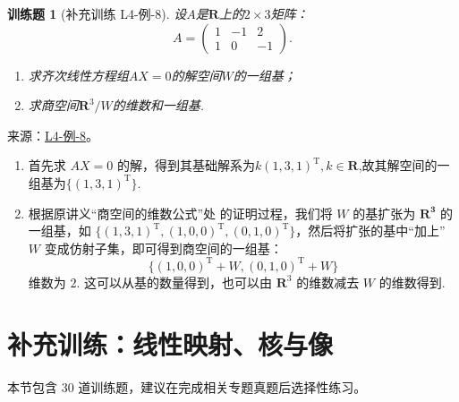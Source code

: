 \documentclass[12pt,fontset=fandol]{ctexart}
\newtheorem{exercise}{训练题}[section]
\begin{document}
\begin{exercise}[补充训练 L4-例-8]\label{prob:L4-例-8}
设$A$是$\mathbf{R}$上的$2\times 3$矩阵：
    \[A=\begin{pmatrix}
            1 & -1 & 2 \\ 1 & 0 & -1
        \end{pmatrix}.\]
    \begin{enumerate}
        \item 求齐次线性方程组$AX=0$的解空间$W$的一组基；

        \item 求商空间$\mathbf{R}^3/W$的维数和一组基.
    \end{enumerate}
\end{exercise}
\noindent 来源：\href{https://github.com/yhwu-is/Linear-Algebra-Left-Undone/blob/new/%E8%AE%B2%E4%B9%89/%E4%B8%93%E9%A2%98/4%20%E7%BA%BF%E6%80%A7%E7%A9%BA%E9%97%B4%E7%9A%84%E8%BF%90%E7%AE%97.tex}{L4-例-8}。
\begin{solve}
\begin{enumerate}
        \item 首先求 $AX=0$ 的解，得到其基础解系为$k(1,3,1)^{\mathrm{T}},k \in \mathbf{R}$,故其解空间的一组基为$\{(1,3,1)^{\mathrm{T}}\}$.
        \item 根据原讲义“商空间的维数公式”处 的证明过程，我们将 $W$ 的基扩张为 $\mathbf{R^3}$ 的一组基，如 $\{(1,3,1)^{\mathrm{T}},(1,0,0)^{\mathrm{T}},(0,1,0)^{\mathrm{T}}\}$，然后将扩张的基中``加上'' $W$ 变成仿射子集，即可得到商空间的一组基：
        \[
            \{(1,0,0)^{\mathrm{T}}+W,(0,1,0)^{\mathrm{T}}+W\}
        \]
        维数为 $2$. 这可以从基的数量得到，也可以由 $\mathbf{R}^3$ 的维数减去 $W$ 的维数得到.

    \end{enumerate}
\end{solve}

\section{补充训练：线性映射、核与像}

本节包含 30 道训练题，建议在完成相关专题真题后选择性练习。
\end{document}
